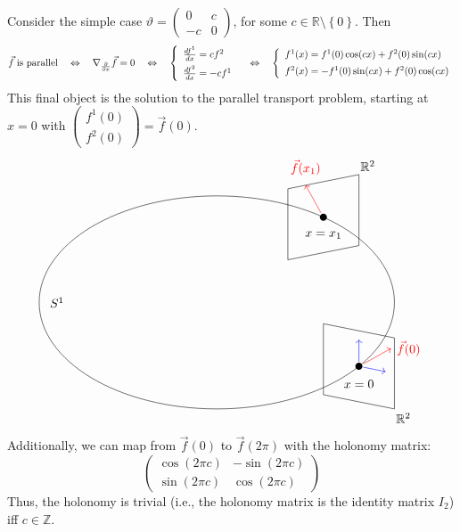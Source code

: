 \documentclass[10pt,letterpaper]{article}
\newcommand{\n}{\hfill\break}
\newcommand{\ptxt}[1]{\textrm{\textnormal{#1}}}
\newcommand{\set}[1]{\left\{#1\right\}}
\newcommand{\integers}{\mathbb{Z}}
\newcommand{\Z}{\integers}
\newcommand{\reals}{\mathbb{R}}
\newcommand{\R}{\reals}
\newcommand{\cut}{\setminus}
\newcommand{\smallPMatrix}[1]{\paren{\begin{smallmatrix}#1\end{smallmatrix}}}
\newcommand{\pd}[2]{\frac{\partial{}#1}{\partial{}#2}}
\newcommand{\paren}[1]{\left(#1\right)}
\begin{document}
\par\noindent
Consider the simple case $\vartheta=\begin{pmatrix}
	0 & c\\ -c & 0
\end{pmatrix}$, for some $c\in\R\cut\set{0}$. Then
\[
	\vec{f}\;\ptxt{is parallel}\quad\Leftrightarrow\quad\nabla_{\pd{}{x}}\vec{f}=0\quad\Leftrightarrow\quad
	\left\{\begin{array}{l}
		\frac{df^{1}}{dx}=cf^{2}\\[5pt]
		\frac{df^{2}}{dx}=-cf^{1}
	\end{array}\right.\quad\Leftrightarrow\quad\left\{\begin{array}{l}
		f^{1}(x)=f^{1}(0)\cos(cx)+f^{2}(0)\sin(cx)\\[5pt]
		f^{2}(x)=-f^{1}(0)\sin(cx)+f^{2}(0)\cos(cx)
	\end{array}\right.
\]
This final object is the solution to the parallel transport problem, starting at $x=0$ with $\smallPMatrix{f^{1}(0)\\ f^{2}(0)}=\vec{f}(0)$.
\[
	\begin{tikzpicture}[scale=1]
		\draw (0,0) circle [x radius=5cm, y radius=3cm];
		\draw (-4.5,0) node {$S^{1}$};
		\node (A) at (4,-{sqrt(9*(1-(16/25)))}) {};
		\node (B) at (3,{sqrt(9*(1-(9/25)))}) {};
		\fill (A) circle [radius=0.1cm];
		\draw (A) + (-1,1.2) -- +(-1,-0.8) -- +(1,-1.2) -- +(1,0.8) -- cycle;
		\draw[blue] [->] (A) edge +(0.75,{0.75*(-1.2 - (-0.8))/2});
		\draw[blue] [->] (A) edge +(0,0.75);
		\draw[red] [->] (A) edge +(0.9, 0.5);
		\draw (A) + (0,-0.5) node {$x=0$};
		\draw[red] (A) + ({0.9+0.5}, 0.5) node {$\vec{f}(0)$};
		\draw (A) + (1.25,-1.45) node {$\R^{2}$};
		\fill (B) circle [radius=0.1cm];
		\draw (B) + (-1,-1.2) -- +(-1,0.8) -- +(+1,1.2) -- +(1,-0.8) -- cycle;
		\draw[red] [->] (B) edge +(-0.5, 0.9);
		\draw (B) + (0,-0.5) node {$x=x_{1}$};
		\draw[red] (B) + (-0.5,{0.9+0.5}) node {$\vec{f}(x_{1})$};
		\draw (B) + (1.25,1.45) node {$\R^{2}$};
	\end{tikzpicture}
\]
Additionally, we can map from $\vec{f}(0)$ to $\vec{f}(2\pi)$ with the holonomy matrix:
\[
	\begin{pmatrix}
		\cos(2\pi{}c) & -\sin(2\pi{}c)\\
		\sin(2\pi{}c) & \cos(2\pi{}c)
	\end{pmatrix}
\]
Thus, the holonomy is trivial (i.e., the holonomy matrix is the identity matrix $I_{2}$) iff $c\in\Z$.\n
\end{document}
